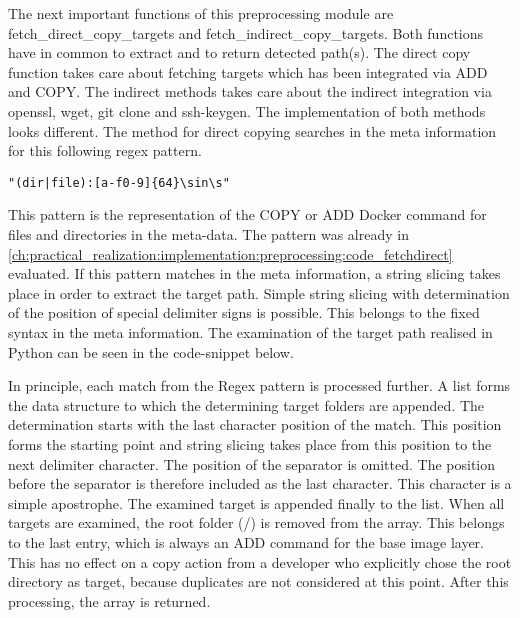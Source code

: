 The next important functions of this preprocessing module are fetch\_direct\_copy\_targets and fetch\_indirect\_copy\_targets. Both functions have in common to extract and to return detected path(s). The direct copy function takes care about fetching targets which has been integrated via ADD and COPY. The indirect methods takes care about the indirect integration via openssl, wget, git clone and ssh-keygen. The implementation of both methods looks different.
The method for direct copying searches in the meta information for this following regex pattern.
\begin{lstlisting}
"(dir|file):[a-f0-9]{64}\sin\s"
\end{lstlisting}
This pattern is the representation of the COPY or ADD Docker command for files and directories in the meta-data. The pattern was already in \ref{ch:practical_realization:implementation:preprocessing:code_fetchdirect} evaluated. If this pattern matches in the meta information, a string slicing takes place in order to extract the target path. Simple string slicing with determination of the position of special delimiter signs is possible. This belongs to the fixed syntax in the meta information.
The examination of the target path realised in Python can be seen in the code-snippet below.

In principle, each match from the Regex pattern is processed further. A list forms the data structure to which the determining target folders are appended. The determination starts with the last character position of the match. This position forms the starting point and string slicing takes place from this position to the next delimiter character. The position of the separator is omitted. The position before the separator is therefore included as the last character. This character is a simple apostrophe. The examined target is appended finally to the list. When all targets are examined, the root folder (/) is removed from the array. This belongs to the last entry, which is always an ADD command for the base image layer. This has no effect on a copy action from a developer who explicitly chose the root directory as target, because duplicates are not considered at this point. After this processing, the array is returned.

